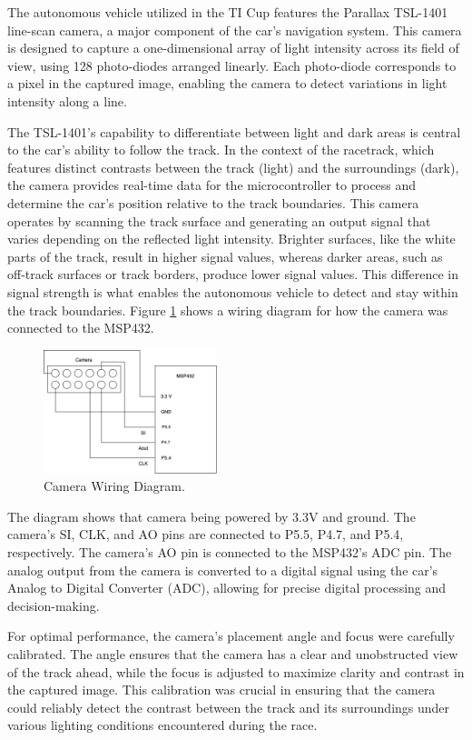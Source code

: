 \documentclass[conference]{IEEEtran}
\begin{document}
The autonomous vehicle utilized in the TI Cup features the Parallax TSL-1401 line-scan camera, a major component of the car's navigation system. This camera is designed to capture a one-dimensional array of light intensity across its field of view, using 128 photo-diodes arranged linearly. Each photo-diode corresponds to a pixel in the captured image, enabling the camera to detect variations in light intensity along a line.

The TSL-1401's capability to differentiate between light and dark areas is central to the car's ability to follow the track. In the context of the racetrack, which features distinct contrasts between the track (light) and the surroundings (dark), the camera provides real-time data for the microcontroller to process and determine the car's position relative to the track boundaries. This camera operates by scanning the track surface and generating an output signal that varies depending on the reflected light intensity. Brighter surfaces, like the white parts of the track, result in higher signal values, whereas darker areas, such as off-track surfaces or track borders, produce lower signal values. This difference in signal strength is what enables the autonomous vehicle to detect and stay within the track boundaries. Figure \ref{fig:camera} shows a wiring diagram for how the camera was connected to the MSP432.

\begin{figure}[htbp]
	\centerline{\includegraphics[width=0.45\textwidth]{images/cameraWiring.png}}
	\caption{Camera Wiring Diagram.}
	\label{fig:camera}
\end{figure}

The diagram shows that camera being powered by 3.3V and ground. The camera's SI, CLK, and AO pins are connected to P5.5, P4.7, and P5.4, respectively. The camera's AO pin is connected to the MSP432's ADC pin. The analog output from the camera is converted to a digital signal using the car's Analog to Digital Converter (ADC), allowing for precise digital processing and decision-making.

For optimal performance, the camera's placement angle and focus were carefully calibrated. The angle ensures that the camera has a clear and unobstructed view of the track ahead, while the focus is adjusted to maximize clarity and contrast in the captured image. This calibration was crucial in ensuring that the camera could reliably detect the contrast between the track and its surroundings under various lighting conditions encountered during the race.
\end{document}
